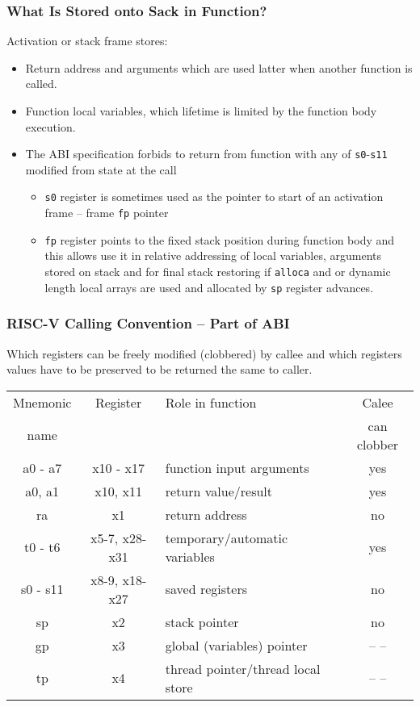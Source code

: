 \documentclass{beamer}
\begin{document}
\begin{frame}
\frametitle{What Is Stored onto Sack in Function?}

Activation or stack frame stores:
\begin{itemize}
 \item Return address and arguments which are used latter when another function is called.
 \item Function local variables, which lifetime is limited by the function body execution.
 \item The ABI specification forbids to return from function with any of \texttt{s0}-\texttt{s11} modified from state at the call
\begin{itemize}
 \item \texttt{s0} register is sometimes used as the pointer to start of an activation frame -- frame \texttt{fp} pointer
 \item \texttt{fp} register points to the fixed stack position during function body and this allows use it in relative addressing of local variables, arguments stored on stack and for final stack restoring if \texttt{alloca} and or dynamic length local arrays are used and allocated by \texttt{sp} register advances.
\end{itemize}
\end{itemize}
\end{frame}


\begin{frame}
\frametitle{RISC-V Calling Convention -- Part of ABI}

Which registers can be freely modified (clobbered) by callee and which registers values have to be preserved to be returned the same to caller.

\begin{tabular}{|c|c|p{4cm}|c|}\hline
Mnemonic & Register & Role in function & Calee \\
   name  &          &       &   can clobber \\ \hline
a0 - a7 & x10 - x17 & function input arguments & yes \\\hline
a0, a1 & x10, x11 & return value/result & yes \\\hline
ra & x1 & return address & no \\\hline
t0 - t6 & x5-7, x28-x31 & temporary/automatic variables & yes \\\hline
s0 - s11 & x8-9, x18-x27 & saved registers & no\\\hline
sp & x2 & stack pointer & no\\\hline
gp & x3 & global (variables) pointer & -- --\\\hline
tp & x4 & thread pointer/thread local store & -- --\\\hline
\end{tabular}
\end{frame}
\end{document}
